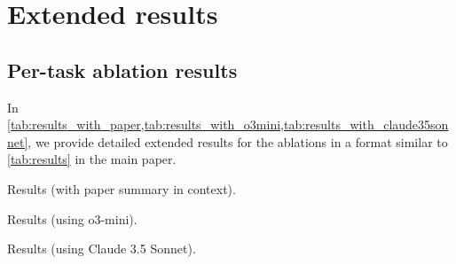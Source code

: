 \section{Extended results}
\label{app:extended_results}

\subsection{Per-task ablation results}
\label{app:extended_ablation_results}
In \cref{tab:results_with_paper,tab:results_with_o3mini,tab:results_with_claude35sonnet}, we provide detailed extended results for the ablations in a format similar to \cref{tab:results} in the main paper.

\begin{table*}
  \centering
  \caption{Results (with paper summary in context).}
  \label{tab:results_with_paper}
\end{table*}
\begin{table*}
  \centering
  \caption{Results (using o3-mini).}
  \label{tab:results_with_o3mini}
\end{table*}
\begin{table*}
  \centering
  \caption{Results (using Claude 3.5 Sonnet).}
  \label{tab:results_with_claude35sonnet}
\end{table*}

